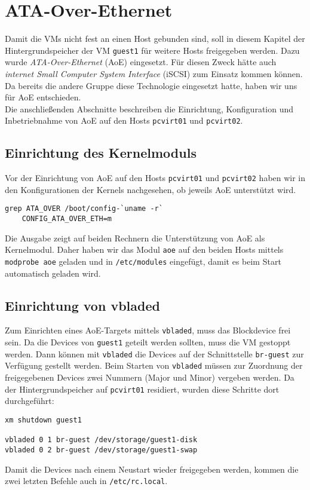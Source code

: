 \chapter{ATA-Over-Ethernet}
\label{chap:aoe}
Damit die VMs nicht fest an einen Host gebunden sind, soll in diesem Kapitel der Hintergrundspeicher der VM \verb#guest1# für weitere Hosts freigegeben werden. Dazu wurde \emph{ATA-Over-Ethernet} (AoE) \cite{hopkins2006aoe} eingesetzt. Für diesen Zweck hätte auch \emph{internet Small Computer System Interface} (iSCSI) \cite{rfc3720} zum Einsatz kommen können. Da bereits die andere Gruppe diese Technologie eingesetzt hatte, haben wir uns für AoE entschieden. 
\\
Die anschließenden Abschnitte beschreiben die Einrichtung, Konfiguration und Inbetriebnahme von AoE auf den Hosts \verb#pcvirt01# und \verb#pcvirt02#.

\section{Einrichtung des Kernelmoduls}
Vor der Einrichtung von AoE auf den Hosts \verb#pcvirt01# und \verb#pcvirt02# haben wir in den Konfigurationen der Kernels nachgesehen, ob jeweils AoE unterstützt wird. 
\setupVerbatimOut
\begin{verbatim}
grep ATA_OVER /boot/config-`uname -r`
    CONFIG_ATA_OVER_ETH=m
\end{verbatim} 
Die Ausgabe zeigt auf beiden Rechnern die Unterstützung von AoE als Kernelmodul. Daher haben wir das Modul \verb#aoe# auf den beiden Hosts mittels \verb#modprobe aoe# geladen und  in \verb#/etc/modules# eingefügt, damit es beim Start automatisch geladen wird. 

\section{Einrichtung von vbladed}
Zum Einrichten eines AoE-Targets mittels \verb#vbladed#, muss das Blockdevice frei sein. Da die Devices von \verb#guest1# geteilt werden sollten, muss die VM gestoppt werden. Dann können mit \verb#vbladed# die Devices auf der Schnittstelle \verb#br-guest# zur Verfügung gestellt werden. Beim Starten von \verb#vbladed# müssen zur Zuordnung der freigegebenen Devices zwei Nummern (Major und Minor) vergeben werden. Da der Hintergrundspeicher auf \verb#pcvirt01# residiert, wurden diese Schritte dort durchgeführt:
\setupVerbatimOut
\begin{verbatim}
xm shutdown guest1

vbladed 0 1 br-guest /dev/storage/guest1-disk  
vbladed 0 2 br-guest /dev/storage/guest1-swap
\end{verbatim}
Damit die Devices nach einem Neustart wieder freigegeben werden, kommen die zwei letzten Befehle auch in \verb#/etc/rc.local#. 
